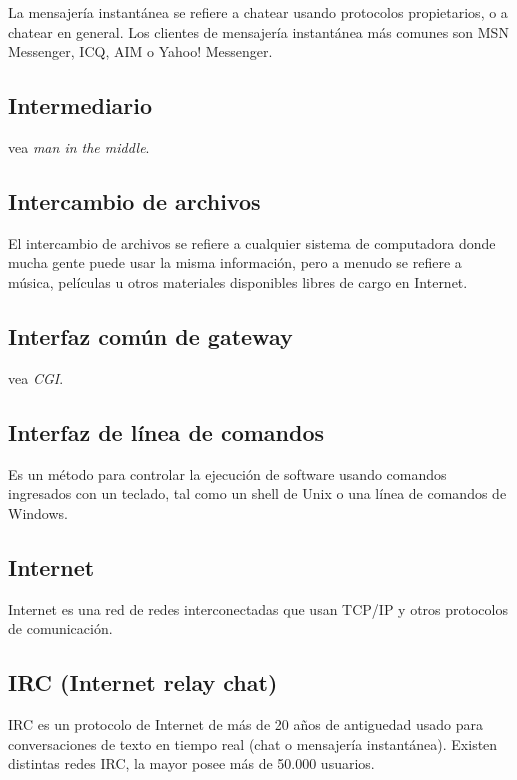 La mensajería instantánea se refiere a chatear usando protocolos
propietarios, o a chatear en general. Los clientes de mensajería
instantánea más comunes son MSN Messenger, ICQ, AIM o Yahoo! Messenger.

\subsection{Intermediario}\label{intermediario}

vea \emph{man in the middle}.

\subsection{Intercambio de archivos}\label{intercambio-de-archivos}

El intercambio de archivos se refiere a cualquier sistema de computadora
donde mucha gente puede usar la misma información, pero a menudo se
refiere a música, películas u otros materiales disponibles libres de
cargo en Internet.

\subsection{Interfaz común de
gateway}\label{interfaz-comuxfan-de-gateway}

vea \emph{CGI}.

\subsection{Interfaz de línea de
comandos}\label{interfaz-de-luxednea-de-comandos}

Es un método para controlar la ejecución de software usando comandos
ingresados con un teclado, tal como un shell de Unix o una línea de
comandos de Windows.

\subsection{Internet}\label{internet}

Internet es una red de redes interconectadas que usan TCP/IP y otros
protocolos de comunicación.

\subsection{IRC (Internet relay chat)}\label{irc-internet-relay-chat}

IRC es un protocolo de Internet de más de 20 años de antiguedad usado
para conversaciones de texto en tiempo real (chat o mensajería
instantánea). Existen distintas redes IRC, la mayor posee más de 50.000
usuarios.

